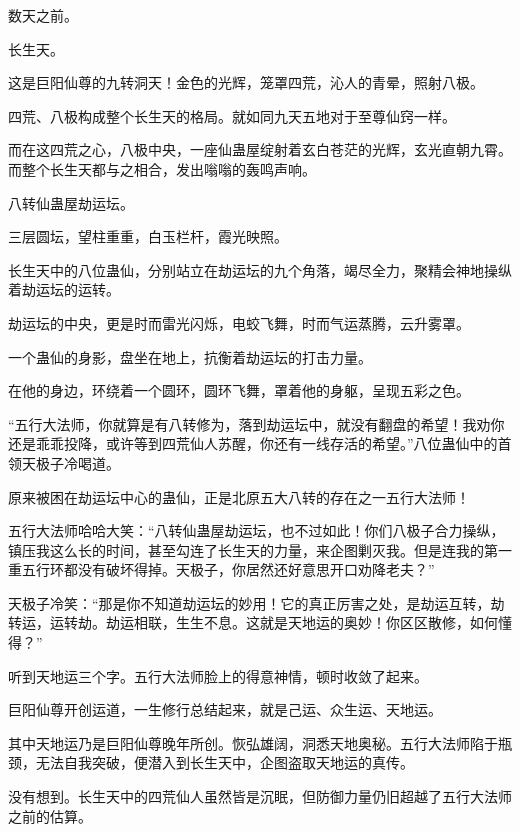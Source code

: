 
\begin{this_body}



数天之前。

长生天。

这是巨阳仙尊的九转洞天！金色的光辉，笼罩四荒，沁人的青晕，照射八极。

四荒、八极构成整个长生天的格局。就如同九天五地对于至尊仙窍一样。

而在这四荒之心，八极中央，一座仙蛊屋绽射着玄白苍茫的光辉，玄光直朝九霄。而整个长生天都与之相合，发出嗡嗡的轰鸣声响。

八转仙蛊屋劫运坛。

三层圆坛，望柱重重，白玉栏杆，霞光映照。

长生天中的八位蛊仙，分别站立在劫运坛的九个角落，竭尽全力，聚精会神地操纵着劫运坛的运转。

劫运坛的中央，更是时而雷光闪烁，电蛟飞舞，时而气运蒸腾，云升雾罩。

一个蛊仙的身影，盘坐在地上，抗衡着劫运坛的打击力量。

在他的身边，环绕着一个圆环，圆环飞舞，罩着他的身躯，呈现五彩之色。

“五行大法师，你就算是有八转修为，落到劫运坛中，就没有翻盘的希望！我劝你还是乖乖投降，或许等到四荒仙人苏醒，你还有一线存活的希望。”八位蛊仙中的首领天极子冷喝道。

原来被困在劫运坛中心的蛊仙，正是北原五大八转的存在之一五行大法师！

五行大法师哈哈大笑：“八转仙蛊屋劫运坛，也不过如此！你们八极子合力操纵，镇压我这么长的时间，甚至勾连了长生天的力量，来企图剿灭我。但是连我的第一重五行环都没有破坏得掉。天极子，你居然还好意思开口劝降老夫？”

天极子冷笑：“那是你不知道劫运坛的妙用！它的真正厉害之处，是劫运互转，劫转运，运转劫。劫运相联，生生不息。这就是天地运的奥妙！你区区散修，如何懂得？”

听到天地运三个字。五行大法师脸上的得意神情，顿时收敛了起来。

巨阳仙尊开创运道，一生修行总结起来，就是己运、众生运、天地运。

其中天地运乃是巨阳仙尊晚年所创。恢弘雄阔，洞悉天地奥秘。五行大法师陷于瓶颈，无法自我突破，便潜入到长生天中，企图盗取天地运的真传。

没有想到。长生天中的四荒仙人虽然皆是沉眠，但防御力量仍旧超越了五行大法师之前的估算。


\end{this_body}
